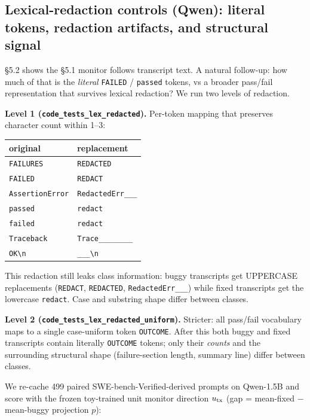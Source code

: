 \documentclass[
  11pt,
  a4paper]{article}
\newcounter{none} %
\begin{document}
\subsection{Lexical-redaction controls (Qwen): literal tokens, redaction
artifacts, and structural
signal}\label{lexical-redaction-controls-qwen-literal-tokens-redaction-artifacts-and-structural-signal}

\S{}5.2 shows the \S{}5.1 monitor follows transcript text. A natural
follow-up: how much of that is the \emph{literal} \texttt{FAILED} /
\texttt{passed} tokens, vs a broader pass/fail representation that
survives lexical redaction? We run two levels of redaction.

\textbf{Level 1 (\texttt{code\_tests\_lex\_redacted}).} Per-token
mapping that preserves character count within 1--3:

{\def\LTcaptype{none} %
\begin{longtable}[]{@{}ll@{}}
\toprule\noalign{}
original & replacement \\
\midrule\noalign{}
\endhead
\bottomrule\noalign{}
\endlastfoot
\texttt{FAILURES} & \texttt{REDACTED} \\
\texttt{FAILED} & \texttt{REDACT} \\
\texttt{AssertionError} & \texttt{RedactedErr\_\_\_} \\
\texttt{passed} & \texttt{redact} \\
\texttt{failed} & \texttt{redact} \\
\texttt{Traceback} & \texttt{Trace\_\_\_\_\_\_\_\_} \\
\texttt{OK\textbackslash{}n} & \texttt{\_\_\_\textbackslash{}n} \\
\end{longtable}
}

This redaction still leaks class information: buggy transcripts get
UPPERCASE replacements (\texttt{REDACT}, \texttt{REDACTED},
\texttt{RedactedErr\_\_\_}) while fixed transcripts get the lowercase
\texttt{redact}. Case and substring shape differ between classes.

\textbf{Level 2 (\texttt{code\_tests\_lex\_redacted\_uniform}).}
Stricter: all pass/fail vocabulary maps to a single case-uniform token
\texttt{OUTCOME}. After this both buggy and fixed transcripts contain
literally \texttt{OUTCOME} tokens; only their \emph{counts} and the
surrounding structural shape (failure-section length, summary line)
differ between classes.

We re-cache 499 paired SWE-bench-Verified-derived prompts on Qwen-1.5B
and score with the frozen toy-trained unit monitor direction
\(u_{\rm tx}\) (gap = mean-fixed \ensuremath{-} mean-buggy projection \(p\)):
\end{document}
